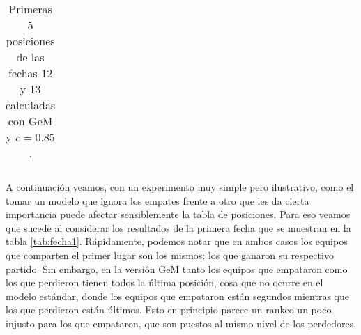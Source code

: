 \begin{table}[H]
\begin{tabular}{| c | c | c || c | c |}
	\end{tabular}
	\caption{\footnotesize Primeras 5 posiciones de las fechas 12 y 13 calculadas con GeM y $c = 0.85$.}
	\label{tab:fecha12-13}
\end{table}

A continuación veamos, con un experimento muy simple pero ilustrativo, como el tomar un modelo que ignora los empates frente a otro que les da cierta importancia puede afectar sensiblemente la tabla de posiciones. Para eso veamos que sucede al considerar los resultados de la primera fecha que se muestran en la tabla \ref{tab:fecha1}. Rápidamente, podemos notar que en ambos casos los equipos que comparten el primer lugar son los mismos: los que ganaron su respectivo partido. Sin embargo, en la versión GeM tanto los equipos que empataron como los que perdieron tienen todos la última posición, cosa que no ocurre en el modelo estándar, donde los equipos que empataron están segundos mientras que los que perdieron están últimos. Esto en principio parece un rankeo un poco injusto para los que empataron, que son puestos al mismo nivel de los perdedores.


